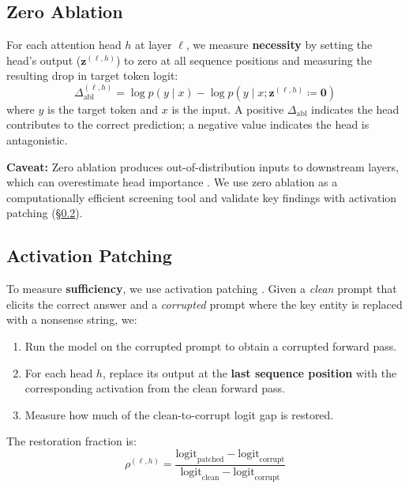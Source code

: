\documentclass[11pt]{article}
\begin{document}
\subsection{Zero Ablation}
\label{sec:method:ablation}

For each attention head $h$ at layer $\ell$, we measure \textbf{necessity} by setting the head's output ($\mathbf{z}^{(\ell,h)}$) to zero at all sequence positions and measuring the resulting drop in target token logit:
\begin{equation}
\Delta_{\text{abl}}^{(\ell,h)} = \log p(y \mid x) - \log p(y \mid x; \mathbf{z}^{(\ell,h)} \coloneqq \mathbf{0})
\label{eq:ablation}
\end{equation}
where $y$ is the target token and $x$ is the input.
A positive $\Delta_{\text{abl}}$ indicates the head contributes to the correct prediction; a negative value indicates the head is antagonistic.

\textbf{Caveat:} Zero ablation produces out-of-distribution inputs to downstream layers, which can overestimate head importance \cite{li2024optimal}.
We use zero ablation as a computationally efficient screening tool and validate key findings with activation patching (\S\ref{sec:method:patching}).

\subsection{Activation Patching}
\label{sec:method:patching}

To measure \textbf{sufficiency}, we use activation patching \cite{nanda2023attribution, dumas2025separating}.
Given a \emph{clean} prompt that elicits the correct answer and a \emph{corrupted} prompt where the key entity is replaced with a nonsense string, we:
\begin{enumerate}
\item Run the model on the corrupted prompt to obtain a corrupted forward pass.
\item For each head $h$, replace its output at the \textbf{last sequence position} with the corresponding activation from the clean forward pass.
\item Measure how much of the clean-to-corrupt logit gap is restored.
\end{enumerate}
The restoration fraction is:
\begin{equation}
\rho^{(\ell,h)} = \frac{\text{logit}_{\text{patched}} - \text{logit}_{\text{corrupt}}}{\text{logit}_{\text{clean}} - \text{logit}_{\text{corrupt}}}
\label{eq:patching}
\end{equation}
\end{document}
